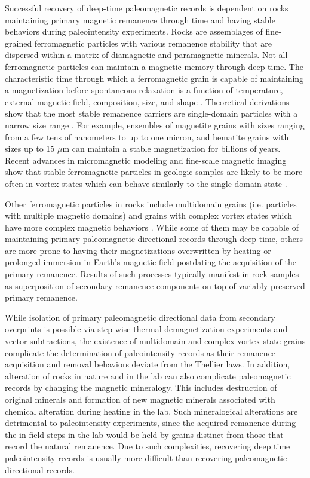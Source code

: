 Successful recovery of deep-time paleomagnetic records is dependent on rocks maintaining primary magnetic remanence through time and having stable behaviors during paleointensity experiments. Rocks are assemblages of fine-grained ferromagnetic particles with various remanence stability that are dispersed within a matrix of diamagnetic and paramagnetic minerals. Not all ferromagnetic particles can maintain a magnetic memory through deep time. The characteristic time through which a ferromagnetic grain is capable of maintaining a magnetization before spontaneous relaxation is a function of temperature, external magnetic field, composition, size, and shape \citep{Neel1955a}. Theoretical derivations show that the most stable remanence carriers are single-domain particles with a narrow size range \citep{Butler1975a, Butler1992a}. For example, ensembles of magnetite grains with sizes ranging from a few tens of nanometers to up to one micron, and hematite grains with sizes up to 15 $\mu$m can maintain a stable magnetization for billions of years. Recent advances in micromagnetic modeling and fine-scale magnetic imaging show that stable ferromagnetic particles in geologic samples are likely to be more often in vortex states which can behave similarly to the single domain state \citep{Nagy2017a, Tauxe2020a, CortesOrtuno2022a}. 

Other ferromagnetic particles in rocks include multidomain grains (i.e. particles with multiple magnetic domains) and grains with complex vortex states which have more complex magnetic behaviors \citep{Williams2010a}. While some of them may be capable of maintaining primary paleomagnetic directional records through deep time, others are more prone to having their magnetizations overwritten by heating or prolonged immersion in Earth's magnetic field postdating the acquisition of the primary remanence. Results of such processes typically manifest in rock samples as superposition of secondary remanence components on top of variably preserved primary remanence. 

While isolation of primary paleomagnetic directional data from secondary overprints is possible via step-wise thermal demagnetization experiments and vector subtractions, the existence of multidomain and complex vortex state grains complicate the determination of paleointensity records as their remanence acquisition and removal behaviors deviate from the Thellier laws. In addition, alteration of rocks in nature and in the lab can also complicate paleomagnetic records by changing the magnetic mineralogy. This includes destruction of original minerals and formation of new magnetic minerals associated with chemical alteration during heating in the lab. Such mineralogical alterations are detrimental to paleointensity experiments, since the acquired remanence during the in-field steps in the lab would be held by grains distinct from those that record the natural remanence. Due to such complexities, recovering deep time paleointensity records is usually more difficult than recovering paleomagnetic directional records. 


